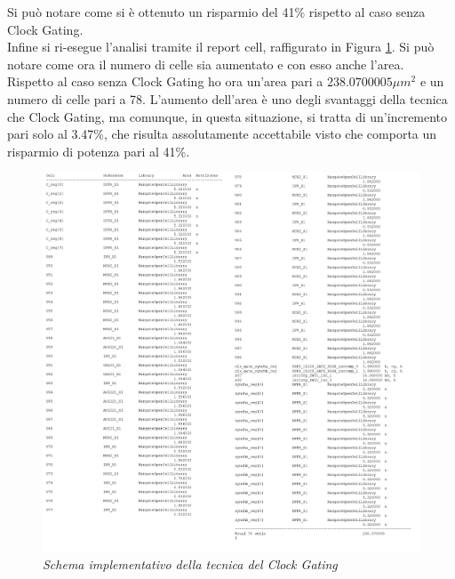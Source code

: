 Si può notare come si è ottenuto un risparmio del 41\% rispetto al caso senza Clock Gating. \\
Infine si ri-esegue l'analisi tramite il report cell, raffigurato in Figura \ref{3_11}. Si può notare come ora il numero di celle sia aumentato e con esso anche l'area.\\
Rispetto al caso senza Clock Gating ho ora un'area pari a $238.0700005 \mu m^{2}$ e un numero di celle pari a 78. L'aumento dell'area è uno degli svantaggi della tecnica che Clock Gating, ma comunque, in questa situazione, si tratta di un'incremento pari solo al 3.47\%, che risulta assolutamente accettabile visto che comporta un risparmio di potenza pari al 41\%.
\begin{figure}[!htb]
	\centering
	\includegraphics[scale=0.65]{immagini/3_11}
	\caption{\textit{Schema implementativo della tecnica del Clock Gating}}
	\label{3_11}
\end{figure}

